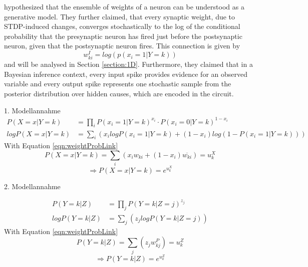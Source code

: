 \citet{nessler} hypothesized that the ensemble of weights of a neuron can be understood as a generative model. They further claimed, that every synaptic weight, due to STDP-induced changes,  converges stochastically to the log of the conditional probability that the presynaptic neuron has fired just before the postsynaptic neuron, given that the postsynaptic neuron fires. This connection is given by
\begin{equation}
\label{eqn:weightProbLink}
 w^{I}_{ki} = log(p(x_i = 1 | Y = k))
\end{equation}
and will be analysed in Section \ref{section:1D}.
Furthermore, they claimed that in a Bayesian inference context, every input spike provides evidence for an observed variable and every output spike represents one stochastic sample from the posterior distribution over hidden causes, which are encoded in the circuit. 


1. Modellannahme
\begin{equation}
\begin{split}
P(X=x|Y=k) &= \prod_i P(x_i=1|Y=k)^{x_i} \cdot P(x_i=0|Y=k)^{1-x_i}\\
log P(X=x|Y=k) &= \sum_i (x_i log P(x_i=1|Y=k) + (1-x_i) log (1 - P(x_i=1|Y=k)))
\end{split}
\end{equation}
With Equation \ref{eqn:weightProbLink}
\begin{equation}
P(X=x|Y=k) = \sum_i (x_i w_{ki} + (1-x_i)\overline{w_{ki}}) = u^X_k
\end{equation}
\begin{equation}
\Rightarrow P(X=x|Y=k) = e^{u^X_k}
\end{equation}

2. Modellannahme

\begin{equation}
\begin{split}
P(Y=k|Z) &= \prod_j P(Y=k|Z=j)^{z_j}\\
log P(Y=k|Z) &= \sum_j (z_j log P(Y=k|Z=j))
\end{split}
\end{equation}
With Equation \ref{eqn:weightProbLink}
\begin{equation}
P(Y=k|Z) = \sum_j (z_j w^P_{kj}) = u^Z_k
\end{equation}
\begin{equation}
\Rightarrow P(Y=k|Z) = e^{u^Z_k}
\end{equation}

